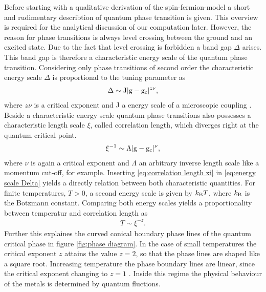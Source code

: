 Before starting with a qualitative derivation of the spin-fermion-model a short and rudimentary describtion of quantum phase transition is given.
This overview is required for the analytical discussion of our computation later.
However, the reason for phase transitions is always level crossing between the ground and an excited state.
Due to the fact that level crossing is forbidden a band gap $\Delta$ arises.
This band gap is therefore a characteristic energy scale of the quantum phase transition.
Considering only phase transitions of second order the characteristic energy scale $\Delta$ is proportional to the tuning parameter as
%
\begin{align}
	\Delta \sim \mathrm{J} |\mathrm{g} - \mathrm{g}_{\mathrm{c}}|^{z \nu},
	\label{eq:energy scale Delta}
\end{align}
%
where $z\nu$ is a critical exponent and J a energy scale of a microscopic coupling \cite{SachdevQCP}.
Beside a characteristic energy scale quantum phase transitions also possesses a characteristic length scale $\xi$, called correlation length, which diverges right at the quantum critical point.
%
\begin{align}
	\xi^{-1} \sim \Lambda |\mathrm{g} - \mathrm{g}_{\mathrm{c}}|^{\nu},
	\label{eq:correlation length xi}
\end{align}
%
where $\nu$ is again a critical exponent and $\Lambda$ an arbitrary inverse length scale like a momentum cut-off, for example.
Inserting \eqref{eq:correlation length xi} in \eqref{eq:energy scale Delta} yields a directly relation between both characteristic quantities.
For finite temperatures, $T > 0$, a second energy scale is given by $k_{\mathrm{B}} T$, where $k_{\mathrm{B}}$ is the Botzmann constant.
Comparing both energy scales yields a proportionality between temperatur and correlation length as
%
\begin{align}
	T \sim \xi^{-z}.
	\label{relation temperature and correlation length}
\end{align}
%
Further this explaines the curved conical boundary phase lines of the quantum critical phase in figure \ref{fig:phase diagram}.
In the case of small temperatures the critical exponent $z$ attains the value $z = 2$, so that the phase lines are shaped like a square root.
Increasing temperature the phase boundary lines are linear, since the critical exponent changing to $z = 1$ \cite{Patel&Sachdev}.
Inside this regime the physical behaviour of the metals is determined by quantum fluctions.

